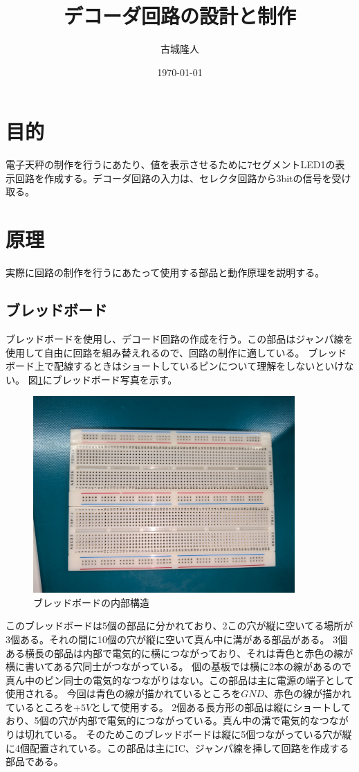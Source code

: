 \documentclass[a4paper,11pt]{jsarticle}
\begin{document}
\title{デコーダ回路の設計と制作}
\author{古城隆人}
\date{\today}
\maketitle

\newpage
\section{目的}
電子天秤の制作を行うにあたり、値を表示させるために7セグメントLED1の表示回路を作成する。デコーダ回路の入力は、セレクタ回路から3bitの信号を受け取る。
\section{原理}
実際に回路の制作を行うにあたって使用する部品と動作原理を説明する。
\subsection{ブレッドボード}
ブレッドボードを使用し、デコード回路の作成を行う。この部品はジャンパ線を使用して自由に回路を組み替えれるので、回路の制作に適している。
ブレッドボード上で配線するときはショートしているピンについて理解をしないといけない。
図\ref{fig:breadboard}にブレッドボード写真を示す。
\begin{figure}[h]
  \centering
  \includegraphics[width=10cm]{./images/breadboard.jpg}
  \caption{ブレッドボードの内部構造}
  \label{fig:breadboard}
\end{figure}
このブレッドボードは5個の部品に分かれており、2この穴が縦に空いてる場所が3個ある。それの間に10個の穴が縦に空いて真ん中に溝がある部品がある。
3個ある横長の部品は内部で電気的に横につながっており、それは青色と赤色の線が横に書いてある穴同士がつながっている。
個の基板では横に2本の線があるので真ん中のピン同士の電気的なつながりはない。この部品は主に電源の端子として使用される。
今回は青色の線が描かれているところを$GND$、赤色の線が描かれているところを$+5V$として使用する。
2個ある長方形の部品は縦にショートしており、5個の穴が内部で電気的につながっている。真ん中の溝で電気的なつながりは切れている。
そのためこのブレッドボードは縦に5個つながっている穴が縦に4個配置されている。この部品は主にIC、ジャンパ線を挿して回路を作成する部品である。
\end{document}

